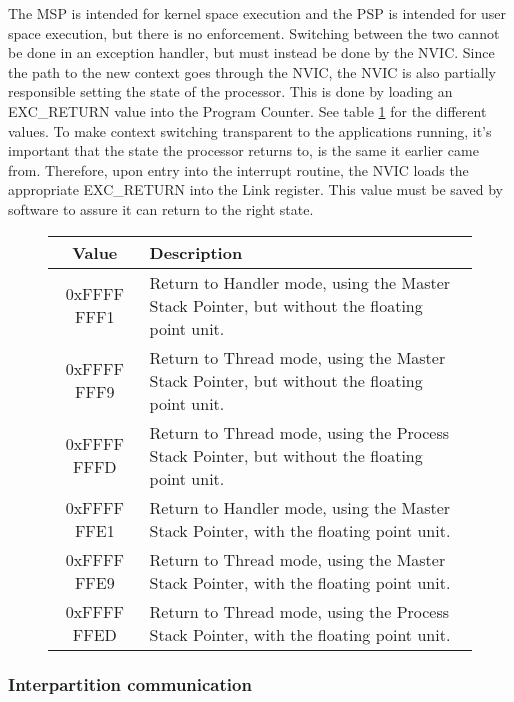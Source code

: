 The MSP is intended for kernel space execution and the PSP is intended for user space execution, but there is no enforcement.
Switching between the two cannot be done in an exception handler, but must instead be done by the NVIC.
Since the path to the new context goes through the NVIC, the NVIC is also partially responsible setting the state of the processor.
This is done by loading an EXC\_RETURN value into the Program Counter. See table \ref{tab:exc-return} for the different values.
To make context switching transparent to the applications running, it's important that the state the processor returns to, is the
same it earlier came from. Therefore, upon entry into the interrupt routine, the NVIC loads the appropriate EXC\_RETURN into the Link
register. This value must be saved by software to assure it can return to the right state.
\begin{figure}[H]
	\centering
	\begin{tabular}{|c|p{10cm}|}
		\hline
		Value			&	Description 	\\
		\hline
		0xFFFF FFF1 	&	Return to Handler mode, using the Master Stack Pointer, but without the floating point unit.	\\
		\hline
		0xFFFF FFF9		&	Return to Thread mode, using the Master Stack Pointer, but without the floating point unit.		\\
		\hline
		0xFFFF FFFD		&	Return to Thread mode, using the Process Stack Pointer, but without the floating point unit.	\\
		\hline
		0xFFFF FFE1		&	Return to Handler mode, using the Master Stack Pointer, with the floating point unit.			\\
		\hline
		0xFFFF FFE9		&	Return to Thread mode, using the Master Stack Pointer, with the floating point unit.			\\
		\hline
		0xFFFF FFED		&	Return to Thread mode, using the Process Stack Pointer, with the floating point unit.			\\
		\hline
	\end{tabular}
	\label{tab:exc-return}
\end{figure}

\subsubsection{Interpartition communication}

